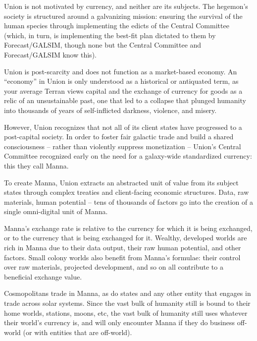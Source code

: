 Union is not motivated by currency, and neither are its subjects. The hegemon’s society is  
structured around a galvanizing mission: ensuring the survival of the human species through  
implementing the edicts of the Central Committee (which, in turn, is implementing the best-fit  
plan dictated to them by Forecast/GALSIM, though none but the Central Committee and  
Forecast/GALSIM know this). 
 

Union is post-scarcity and does not function as a market-based economy. An “economy” in  
Union is only understood as a historical or antiquated term, as your average Terran views capital  
and the exchange of currency for goods as a relic of an unsustainable past, one that led to a  
collapse that plunged humanity into thousands of years of self-inflicted darkness, violence, and  
misery. 
 

However, Union recognizes that not all of its client states have progressed to a post-capital  
society. In order to foster fair galactic trade and build a shared consciousness  -- rather than  
violently suppress monetization --  Union’s Central Committee recognized early on the need for a  
galaxy-wide standardized currency: this they call Manna. 
 

To create Manna, Union extracts an abstracted unit of value from its subject states through  
complex treaties and client-facing economic structures. Data, raw materials, human potential --  
tens of thousands of factors go into the creation of a single omni-digital unit of Manna.  
 

Manna’s exchange rate is relative to the currency for which it is being exchanged, or to the  
currency that is being exchanged for it. Wealthy, developed worlds are rich in Manna due to their  
data output, their raw human potential, and other factors. Small colony worlds also benefit from  
Manna’s formulae: their control over raw materials, projected development, and so on all  
contribute to a beneficial exchange value. 
 

Cosmopolitans trade in Manna, as do states and any other entity that engages in trade across  
solar systems. Since the vast bulk of humanity still is bound to their home worlds, stations,  
moons, etc, the vast bulk of humanity still uses whatever their world’s currency is, and will only  
encounter Manna if they do business off-world (or with entities that are off-world). 
 